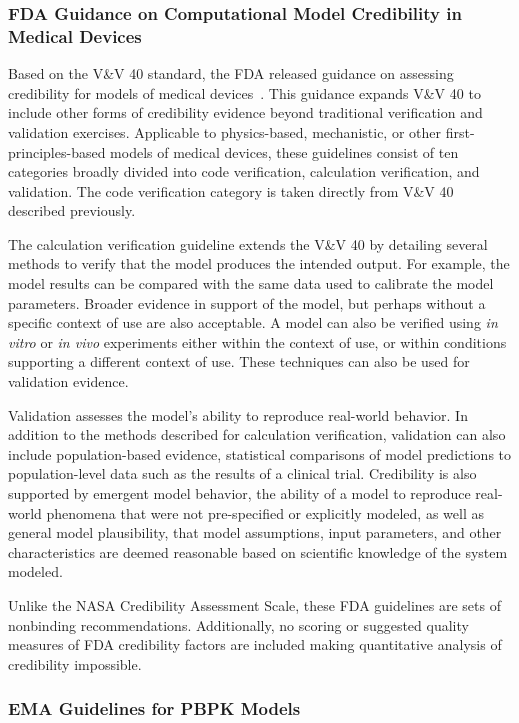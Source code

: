 \documentclass[12pt]{report}
\begin{document}
\subsubsection{FDA Guidance on Computational Model Credibility in Medical Devices}

Based on the V\&V 40 standard, the FDA released guidance on assessing credibility for models of medical devices~\cite{FDAguidelines}. This guidance expands V\&V 40 to include other forms of credibility evidence beyond traditional verification and validation exercises. Applicable to physics-based, mechanistic, or other first-principles-based models of medical devices, these guidelines consist of ten categories broadly divided into code verification, calculation verification, and validation. The code verification category is taken directly from V\&V 40 described previously.

The calculation verification guideline extends the V\&V 40 by detailing several methods to verify that the model produces the intended output.  For example, the model results can be compared with the same data used to calibrate the model parameters. Broader evidence in support of the model, but perhaps without a specific context of use are also acceptable. A model can also be verified using \textit{in vitro} or \textit{in vivo} experiments either within the context of use, or within conditions supporting a different context of use. These techniques can also be used for validation evidence. 

Validation assesses the model's ability to reproduce real-world behavior. In addition to the methods described for calculation verification, validation can also include population-based evidence, statistical comparisons of model predictions to population-level data such as the results of a clinical trial. Credibility is also supported by emergent model behavior, the ability of a model to reproduce real-world phenomena that were not pre-specified or explicitly modeled, as well as general model plausibility, that model assumptions, input parameters, and other characteristics are deemed reasonable based on scientific knowledge of the system modeled. 

Unlike the NASA Credibility Assessment Scale, these FDA guidelines are sets of nonbinding recommendations. Additionally, no scoring or suggested quality measures of FDA credibility factors are included making quantitative analysis of credibility impossible.


\subsubsection{EMA Guidelines for PBPK Models}
\end{document}
